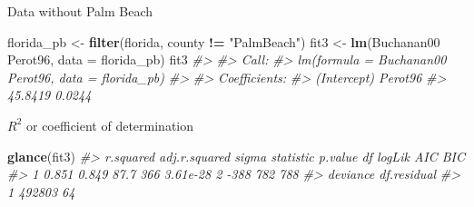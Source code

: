 \documentclass[]{book}
\newenvironment{Shaded}{\begin{snugshade}}{\end{snugshade}}
\newcommand{\KeywordTok}[1]{\textcolor[rgb]{0.13,0.29,0.53}{\textbf{#1}}}
\newcommand{\DataTypeTok}[1]{\textcolor[rgb]{0.13,0.29,0.53}{#1}}
\newcommand{\DecValTok}[1]{\textcolor[rgb]{0.00,0.00,0.81}{#1}}
\newcommand{\StringTok}[1]{\textcolor[rgb]{0.31,0.60,0.02}{#1}}
\newcommand{\CommentTok}[1]{\textcolor[rgb]{0.56,0.35,0.01}{\textit{#1}}}
\newcommand{\OperatorTok}[1]{\textcolor[rgb]{0.81,0.36,0.00}{\textbf{#1}}}
\newcommand{\NormalTok}[1]{#1}
\theoremstyle{definition}
\theoremstyle{definition}
\theoremstyle{definition}
\theoremstyle{remark}
\begin{document}
Data without Palm Beach

\begin{Shaded}
\begin{Highlighting}[]
\NormalTok{florida_pb <-}\StringTok{ }\KeywordTok{filter}\NormalTok{(florida, county }\OperatorTok{!=}\StringTok{ "PalmBeach"}\NormalTok{)}
\NormalTok{fit3 <-}\StringTok{ }\KeywordTok{lm}\NormalTok{(Buchanan00 }\OperatorTok{~}\StringTok{ }\NormalTok{Perot96, }\DataTypeTok{data =}\NormalTok{ florida_pb)}
\NormalTok{fit3}
\CommentTok{#> }
\CommentTok{#> Call:}
\CommentTok{#> lm(formula = Buchanan00 ~ Perot96, data = florida_pb)}
\CommentTok{#> }
\CommentTok{#> Coefficients:}
\CommentTok{#> (Intercept)      Perot96  }
\CommentTok{#>     45.8419       0.0244}
\end{Highlighting}
\end{Shaded}

\(R^2\) or coefficient of determination

\begin{Shaded}
\begin{Highlighting}[]
\KeywordTok{glance}\NormalTok{(fit3)}
\CommentTok{#>   r.squared adj.r.squared sigma statistic  p.value df logLik AIC BIC}
\CommentTok{#> 1     0.851         0.849  87.7       366 3.61e-28  2   -388 782 788}
\CommentTok{#>   deviance df.residual}
\CommentTok{#> 1   492803          64}
\end{Highlighting}
\end{Shaded}

\begin{Shaded}
\end{Shaded}
\end{document}
